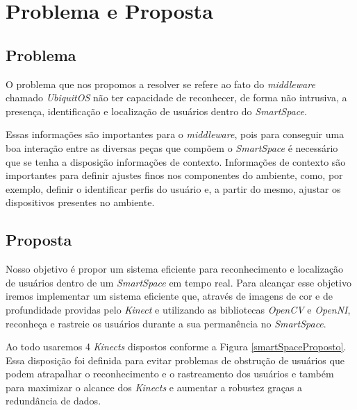 \chapter{Problema e Proposta}


\section{Problema}
	O problema que nos propomos a resolver se refere ao fato do \textit{middleware} chamado \textit{UbiquitOS} não ter capacidade de reconhecer, de forma não intrusiva, a presença, identificação e localização de usuários dentro do \textit{SmartSpace}.

	Essas informações são importantes para o \textit{middleware}, pois para conseguir uma boa interação entre as diversas peças que compõem o \textit{SmartSpace} é necessário que se tenha a disposição informações de contexto. Informações de contexto são importantes para definir ajustes finos nos componentes do ambiente, como, por exemplo, definir o identificar perfis do usuário e, a partir do mesmo, ajustar os dispositivos presentes no ambiente.

\section{Proposta}

	Nosso objetivo é propor um sistema eficiente para reconhecimento e localização de usuários dentro de um \textit{SmartSpace} em tempo real. Para alcançar esse objetivo iremos implementar um sistema eficiente que, através de imagens de cor e de profundidade providas pelo \textit{Kinect} e utilizando as bibliotecas \textit{OpenCV} e \textit{OpenNI}, reconheça e rastreie os usuários durante a sua permanência no \textit{SmartSpace}.


	Ao todo usaremos 4 \textit{Kinects} dispostos conforme a Figura \ref{smartSpaceProposto}. Essa disposição foi definida para evitar problemas de obstrução de usuários que podem atrapalhar o reconhecimento e o rastreamento dos usuários e também para maximizar o alcance dos \textit{Kinects} e aumentar a robustez graças a redundância de dados.

